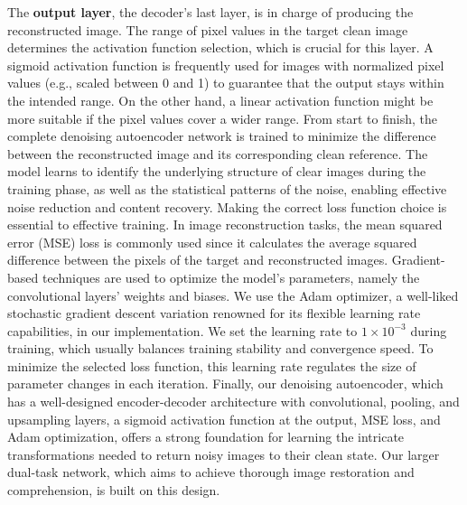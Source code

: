 \documentclass[12pt, conference]{IEEEtran}
\begin{document}
The \textbf{output layer}, the decoder's last layer, is in charge of producing the reconstructed image. The range of pixel values in the target clean image determines the activation function selection, which is crucial for this layer. A sigmoid activation function is frequently used for images with normalized pixel values (e.g., scaled between 0 and 1) to guarantee that the output stays within the intended range. On the other hand, a linear activation function might be more suitable if the pixel values cover a wider range.
From start to finish, the complete denoising autoencoder network is trained to minimize the difference between the reconstructed image and its corresponding clean reference. The model learns to identify the underlying structure of clear images during the training phase, as well as the statistical patterns of the noise, enabling effective noise reduction and content recovery. Making the correct loss function choice is essential to effective training. In image reconstruction tasks, the mean squared error (MSE) loss is commonly used since it calculates the average squared difference between the pixels of the target and reconstructed images.
Gradient-based techniques are used to optimize the model's parameters, namely the convolutional layers' weights and biases.  We use the Adam optimizer, a well-liked stochastic gradient descent variation renowned for its flexible learning rate capabilities, in our implementation.  We set the learning rate to $1 \times 10^{-3}$ during training, which usually balances training stability and convergence speed.  To minimize the selected loss function, this learning rate regulates the size of parameter changes in each iteration.
Finally, our denoising autoencoder, which has a well-designed encoder-decoder architecture with convolutional, pooling, and upsampling layers, a sigmoid activation function at the output, MSE loss, and Adam optimization, offers a strong foundation for learning the intricate transformations needed to return noisy images to their clean state. Our larger dual-task network, which aims to achieve thorough image restoration and comprehension, is built on this design.
\end{document}
